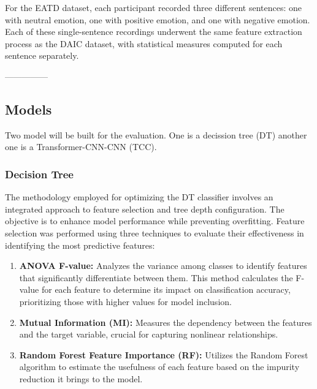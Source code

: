 For the EATD dataset, each participant recorded three different sentences: one with neutral emotion, one with positive emotion, and one with negative emotion. Each of these single-sentence recordings underwent the same feature extraction process as the DAIC dataset, with statistical measures computed for each sentence separately.

---------------





\subsection{Models}
Two model will be built for the evaluation. One is a decission tree (DT) another one is a Transformer-CNN-CNN (TCC)\cite{yin2023depression}.

\subsubsection{Decision Tree}

The methodology employed for optimizing the DT classifier involves an integrated approach to feature selection and tree depth configuration. The objective is to enhance model performance while preventing overfitting. Feature selection was performed using three techniques to evaluate their effectiveness in identifying the most predictive features:

\begin{enumerate}
    \item \textbf{ANOVA F-value:} Analyzes the variance among classes to identify features that significantly differentiate between them. This method calculates the F-value for each feature to determine its impact on classification accuracy, prioritizing those with higher values for model inclusion.
    \item \textbf{Mutual Information (MI):} Measures the dependency between the features and the target variable, crucial for capturing nonlinear relationships.
    \item \textbf{Random Forest Feature Importance (RF):} Utilizes the Random Forest algorithm to estimate the usefulness of each feature based on the impurity reduction it brings to the model.
\end{enumerate}

